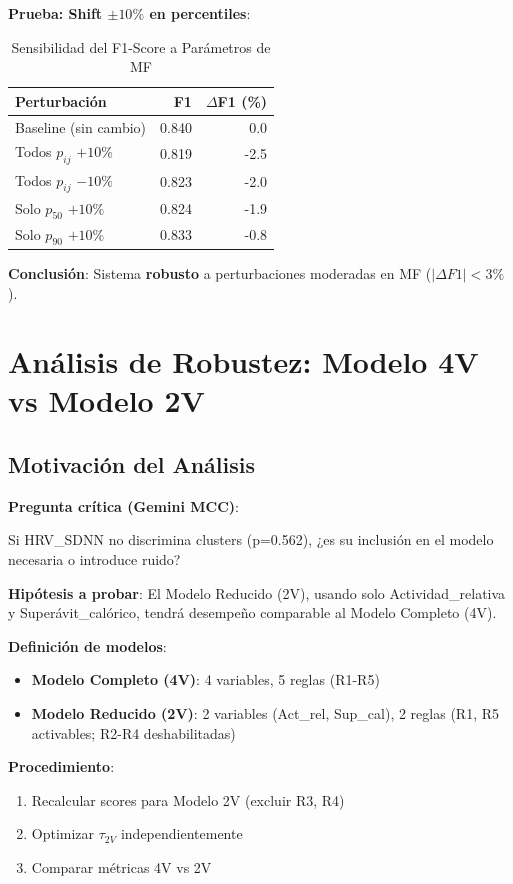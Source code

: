 \documentclass[12pt,letterpaper,twoside]{report}
\begin{document}
\begin{calculobox}
\textbf{Prueba: Shift $\pm 10\%$ en percentiles}:

\begin{table}[H]
\centering
\caption{Sensibilidad del F1-Score a Parámetros de MF}
\label{tab:mf_sensitivity}
\begin{tabular}{@{}lrr@{}}
\toprule
\textbf{Perturbación} & \textbf{F1} & \textbf{$\Delta$F1 (\%)} \\
\midrule
Baseline (sin cambio)   & 0.840 & 0.0 \\
Todos $p_{ij}$ $+10\%$  & 0.819 & -2.5 \\
Todos $p_{ij}$ $-10\%$  & 0.823 & -2.0 \\
Solo $p_{50}$ $+10\%$   & 0.824 & -1.9 \\
Solo $p_{90}$ $+10\%$   & 0.833 & -0.8 \\
\bottomrule
\end{tabular}
\end{table}

\textbf{Conclusión}: Sistema \textbf{robusto} a perturbaciones moderadas en MF ($|\Delta F1| < 3\%$).
\end{calculobox}

\section{Análisis de Robustez: Modelo 4V vs Modelo 2V}

\subsection{Motivación del Análisis}

\begin{hipotesisbox}
\textbf{Pregunta crítica (Gemini MCC)}:

Si HRV\_SDNN no discrimina clusters (p=0.562), ¿es su inclusión en el modelo necesaria o introduce ruido?

\textbf{Hipótesis a probar}: El Modelo Reducido (2V), usando solo Actividad\_relativa y Superávit\_calórico, tendrá desempeño comparable al Modelo Completo (4V).
\end{hipotesisbox}

\begin{estadisticobox}
\textbf{Definición de modelos}:

\begin{itemize}[noitemsep]
    \item \textbf{Modelo Completo (4V)}: 4 variables, 5 reglas (R1-R5)
    \item \textbf{Modelo Reducido (2V)}: 2 variables (Act\_rel, Sup\_cal), 2 reglas (R1, R5 activables; R2-R4 deshabilitadas)
\end{itemize}

\textbf{Procedimiento}:
\begin{enumerate}[noitemsep]
    \item Recalcular scores para Modelo 2V (excluir R3, R4)
    \item Optimizar $\tau_{2V}$ independientemente
    \item Comparar métricas 4V vs 2V
\end{enumerate}
\end{estadisticobox}
\end{document}
